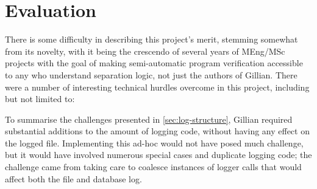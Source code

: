 
\chapter{Evaluation}\label{sec:eval}








There is some difficulty in describing this project's merit, stemming somewhat
from its novelty, with it being the crescendo of several years of MEng/MSc
projects with the goal of making semi-automatic program verification accessible
to any who understand separation logic, not just the authors of Gillian. There
were a number of interesting technical hurdles overcome in this project,
including but not limited to:

To summarise the challenges presented in \autoref{sec:log-structure}, Gillian
required substantial additions to the amount of logging code, without having
any effect on the logged file. Implementing this ad-hoc would not have posed
much challenge, but it would have involved numerous special cases and
duplicate logging code; the challenge came from taking care to coalesce
instances of logger calls that would affect both the file and database log.

